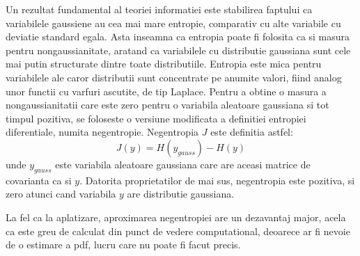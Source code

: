 \documentclass[12pt,oneside]{article}
\begin{document}
Un rezultat fundamental al teoriei informatiei este stabilirea faptului ca variabilele gaussiene au cea mai mare entropie, comparativ cu alte variabile cu deviatie standard egala. Asta inseamna ca entropia poate fi folosita ca si masura pentru nongaussianitate, aratand ca variabilele cu distributie gaussiana sunt cele mai putin structurate dintre toate distributiile. Entropia este mica pentru variabilele ale caror distributii sunt concentrate pe anumite valori, fiind analog unor functii cu varfuri ascutite, de tip Laplace. Pentru a obtine o masura a nongaussianitatii care este zero pentru o variabila aleatoare gaussiana si tot timpul pozitiva, se foloseste o versiune modificata a definitiei entropiei diferentiale, numita negentropie. Negentropia $J$ este definitia astfel:
\begin{equation}
	J(y)=H(y_{gauss})-H(y)	
\end{equation}
unde $y_{gauss}$ este variabila aleatoare gaussiana care are aceasi matrice de covarianta ca si $y$. Datorita proprietatilor de mai sus, negentropia este pozitiva, si zero atunci cand variabila $y$ are distributie gaussiana. 

La fel ca la aplatizare, aproximarea negentropiei are un dezavantaj major, acela ca este greu de calculat din punct de vedere computational, deoarece ar fi nevoie de o estimare a pdf, lucru care nu poate fi facut precis. 
\end{document}
